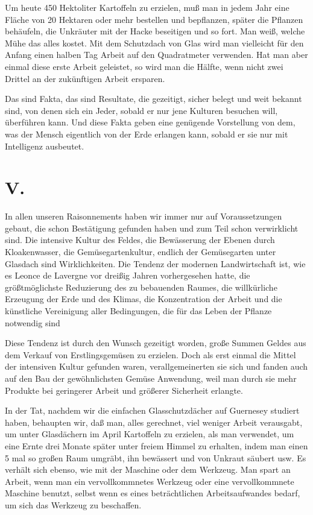 \documentclass{scrbook}
\begin{document}
Um heute 450 Hektoliter Kartoffeln zu erzielen, muß man in jedem Jahr eine Fläche von 20 Hektaren oder mehr bestellen und bepflanzen, später die Pflanzen behäufeln, die Unkräuter mit der Hacke beseitigen und so fort. Man weiß, welche Mühe das alles kostet. Mit dem Schutzdach von Glas wird man vielleicht für den Anfang einen halben Tag Arbeit auf den Quadratmeter verwenden. Hat man aber einmal diese erste Arbeit geleistet, so wird man die Hälfte, wenn nicht zwei Drittel an der zukünftigen Arbeit ersparen.

Das sind Fakta, das sind Resultate, die gezeitigt, sicher belegt und weit bekannt sind, von denen sich ein Jeder, sobald er nur jene Kulturen besuchen will, überführen kann. Und diese Fakta geben eine genügende Vorstellung von dem, was der Mensch eigentlich von der Erde erlangen kann, sobald er sie nur mit Intelligenz ausbeutet.

\section*{V.}

In allen unseren Raisonnements haben wir immer nur auf Voraussetzungen gebaut, die schon Bestätigung gefunden haben und zum Teil schon verwirklicht sind. Die intensive Kultur des Feldes, die Bewässerung der Ebenen durch Kloakenwasser, die Gemüsegartenkultur, endlich der Gemüsegarten unter Glasdach sind Wirklichkeiten. Die Tendenz der modernen Landwirtschaft ist, wie es Leonce de Lavergne vor dreißig Jahren vorhergesehen hatte, die größtmöglichste Reduzierung des zu bebauenden Raumes, die willkürliche Erzeugung der Erde und des Klimas, die Konzentration der Arbeit und die künstliche Vereinigung aller Bedingungen, die für das Leben der Pflanze notwendig sind

Diese Tendenz ist durch den Wunsch gezeitigt worden, große Summen Geldes aus dem Verkauf von Erstlingsgemüsen zu erzielen. Doch als erst einmal die Mittel der intensiven Kultur gefunden waren, verallgemeinerten sie sich und fanden auch auf den Bau der gewöhnlichsten Gemüse Anwendung, weil man durch sie mehr Produkte bei geringerer Arbeit und größerer Sicherheit erlangte.

In der Tat, nachdem wir die einfachen Glasschutzdächer auf Guernesey studiert haben, behaupten wir, daß man, alles gerechnet, viel weniger Arbeit verausgabt, um unter Glasdächern im April Kartoffeln zu erzielen, als man verwendet, um eine Ernte drei Monate später unter freiem Himmel zu erhalten, indem man einen 5 mal so großen Raum umgräbt, ihn bewässert und von Unkraut säubert usw. Es verhält sich ebenso, wie mit der Maschine oder dem Werkzeug. Man spart an Arbeit, wenn man ein vervollkommnetes Werkzeug oder eine vervollkommnete Maschine benutzt, selbst wenn es eines beträchtlichen Arbeitsaufwandes bedarf, um sich das Werkzeug zu beschaffen.
\end{document}
